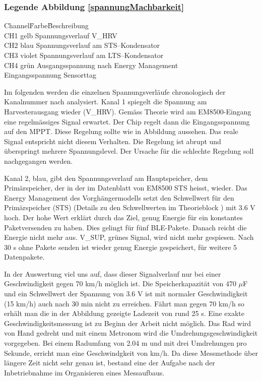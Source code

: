 \subsubsection*{Legende Abbildung \ref{spannungMachbarkeit} }
\begin{tabbing}
    Channel\quad\= Farbe\quad\= Beschreibung\\[0.8ex]
    CH1\> gelb\> Spannungsverlauf V\_HRV\\
    CH2\> blau\> Spannungsverlauf am STS--Kondensator\\
    CH3\> violet\> Spannungsverlauf am LTS--Kondensator\\
    CH4\> grün\> Ausgangsspannung nach Energy Management\\
     \>  \>      Eingangsspannung Sensorttag
\end{tabbing}    

Im folgenden werden die einzelnen Spannungsverläufe chronologisch der Kanalnummer nach analysiert. Kanal 1 spiegelt die Spannung am Harvesterausgang wieder (V\_HRV). Gemäss Theorie  wird am EM8500-Eingang eine regelmässiges Signal erwartet. Der Chip regelt dann die Eingangsspannung auf den MPPT. Diese Regelung sollte wie in Abbildung  aussehen. Das reale Signal entspricht nicht diesem Verhalten. Die Regelung ist abrupt und überspringt mehrere Spannungslevel. Der Ursache für die schlechte Regelung soll nachgegangen werden.

Kanal 2, blau, gibt den Spannungsverlauf am Hauptspeicher, dem Primärspeicher, der in der im Datenblatt von EM8500 STS heisst, wieder. Das Energy Management des Vorghängermodells setzt den Schwellwert für den Primärspeicher (STS) (Details zu den Schwellwerten im Theorieblock ) mit 3.6 V hoch. Der hohe Wert erklärt durch das Ziel, genug Energie für ein konstantes Paketversenden zu haben. Dies gelingt für fünf BLE-Pakete. Danach reicht die Energie nicht mehr aus. V\_SUP, grünes Signal, wird nicht mehr gespiesen. Nach 30 s ohne Pakete senden ist wieder genug Energie gespeichert, für weitere 5 Datenpakete.

In der Auswertung viel uns auf, dass dieser Signalverlauf nur bei einer Geschwindigkeit gegen 70 km/h möglich ist. Die Speicherkapazität von 470 $\mu$F und ein Schwellwert der Spannung von 3.6 V ist mit normaler Geschwindigkeit (15 km/h) auch nach 30 min nicht zu erreichen. Fährt man gegen 70 km/h so erhält man die in der Abbildung gezeigte Ladezeit von rund 25 s. Eine exakte Geschwindigkeitsmessung ist zu Beginn der Arbeit nicht möglich. Das Rad wird von Hand gedreht und mit einem Metronom wird die Umdrehungsgeschwindigkeit vorgegeben. Bei einem Radumfang von 2.04 m und mit drei Umdrehungen pro Sekunde, erricht man eine Geschwindgkeit von  km/h. Da diese Messmethode über längere Zeit nicht sehr genau ist, bestand eine der Aufgabe nach der Inbetriebnahme im Organisieren eines Messaufbaus. 

